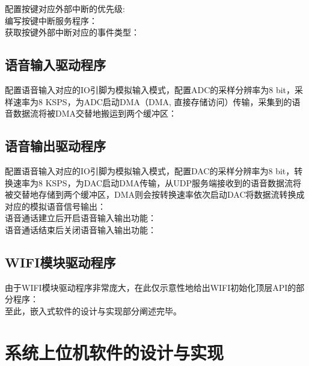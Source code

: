 配置按键对应外部中断的优先级:\\


编写按键中断服务程序：\\


获取按键外部中断对应的事件类型：\\


\subsection{语音输入驱动程序}
配置语音输入对应的IO引脚为模拟输入模式，配置\acrshort{ADC}的采样分辨率为8 bit，采样速率为8 KSPS，为\acrshort{ADC}启动DMA（\acrlong{DMA}, 直接存储访问）传输，采集到的语音数据流将被\acrshort{DMA}交替地搬运到两个缓冲区：\\


\subsection{语音输出驱动程序}
配置语音输入对应的IO引脚为模拟输入模式，配置\acrshort{DAC}的采样分辨率为8 bit，转换速率为8 KSPS，为\acrshort{DAC}启动\acrshort{DMA}传输，从UDP服务端接收到的语音数据流将被交替地存储到两个缓冲区，\acrshort{DMA}则会按转换速率依次启动\acrshort{DAC}将数据流转换成对应的模拟语音信号输出：\\


语音通话建立后开启语音输入输出功能：\\


语音通话结束后关闭语音输入输出功能：\\


\subsection{WIFI模块驱动程序}
由于WIFI模块驱动程序非常庞大，在此仅示意性地给出WIFI初始化顶层API的部分程序：\\


至此，嵌入式软件的设计与实现部分阐述完毕。

\section{系统上位机软件的设计与实现}
